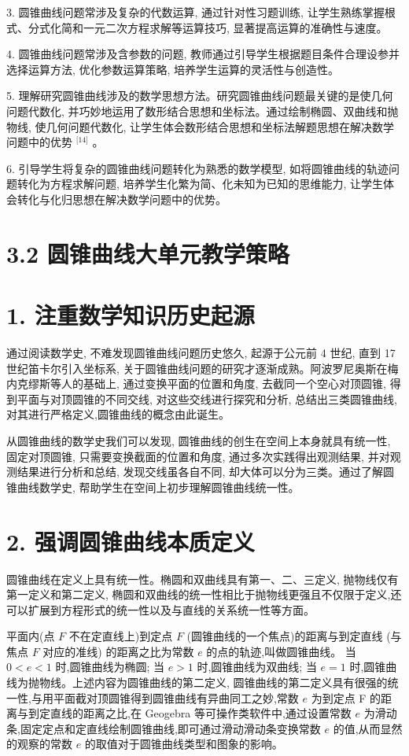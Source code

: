 \documentclass[10pt]{article}
\begin{document}
3. 圆锥曲线问题常涉及复杂的代数运算, 通过针对性习题训练, 让学生熟练掌握根式、分式化简和一元二次方程求解等运算技巧, 显著提高运算的准确性与速度。

4. 圆锥曲线问题常涉及含参数的问题, 教师通过引导学生根据题目条件合理设参并选择运算方法, 优化参数运算策略, 培养学生运算的灵活性与创造性。

5. 理解研究圆锥曲线涉及的数学思想方法。研究圆锥曲线问题最关键的是使几何问题代数化, 并巧妙地运用了数形结合思想和坐标法。通过绘制椭圆、双曲线和抛物线, 使几何问题代数化, 让学生体会数形结合思想和坐标法解题思想在解决数学问题中的优势 \({}^{\lbrack {14}\rbrack }\) 。

6. 引导学生将复杂的圆锥曲线问题转化为熟悉的数学模型, 如将圆锥曲线的轨迹问题转化为方程求解问题, 培养学生化繁为简、化未知为已知的思维能力, 让学生体会转化与化归思想在解决数学问题中的优势。

\section*{3.2 圆锥曲线大单元教学策略}

\section*{1. 注重数学知识历史起源}

通过阅读数学史, 不难发现圆锥曲线问题历史悠久, 起源于公元前 4 世纪, 直到 17 世纪笛卡尔引入坐标系, 关于圆锥曲线问题的研究才逐渐成熟。阿波罗尼奥斯在梅内克缪斯等人的基础上, 通过变换平面的位置和角度, 去截同一个空心对顶圆锥, 得到平面与对顶圆锥的不同交线, 对这些交线进行探究和分析, 总结出三类圆锥曲线,对其进行严格定义,圆锥曲线的概念由此诞生。

从圆锥曲线的数学史我们可以发现, 圆锥曲线的创生在空间上本身就具有统一性, 固定对顶圆锥, 只需要变换截面的位置和角度, 通过多次实践得出观测结果, 并对观测结果进行分析和总结, 发现交线虽各自不同, 却大体可以分为三类。通过了解圆锥曲线数学史, 帮助学生在空间上初步理解圆锥曲线统一性。

\section*{2. 强调圆锥曲线本质定义}

圆锥曲线在定义上具有统一性。椭圆和双曲线具有第一、二、三定义, 抛物线仅有第一定义和第二定义, 椭圆和双曲线的统一性相比于抛物线更强且不仅限于定义,还可以扩展到方程形式的统一性以及与直线的关系统一性等方面。

平面内(点 \(F\) 不在定直线上)到定点 \(F\) (圆锥曲线的一个焦点)的距离与到定直线 (与焦点 \(F\) 对应的准线) 的距离之比为常数 \(e\) 的点的轨迹,叫做圆锥曲线。 当 \(0 < e < 1\) 时,圆锥曲线为椭圆; 当 \(e > 1\) 时,圆锥曲线为双曲线; 当 \(e = 1\) 时,圆锥曲线为抛物线。上述内容为圆锥曲线的第二定义, 圆锥曲线的第二定义具有很强的统一性,与用平面截对顶圆锥得到圆锥曲线有异曲同工之妙,常数 \(e\) 为到定点 F 的距离与到定直线的距离之比,在 Geogebra 等可操作类软件中,通过设置常数 \(e\) 为滑动条,固定定点和定直线绘制圆锥曲线,即可通过滑动滑动条变换常数 \(e\) 的值,从而显然的观察的常数 \(e\) 的取值对于圆锥曲线类型和图象的影响。
\end{document}

